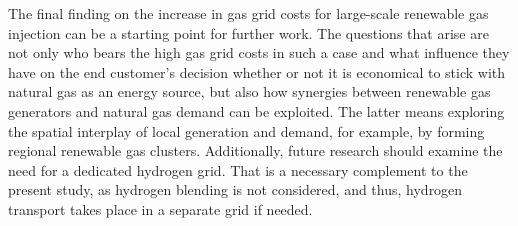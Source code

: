 The final finding on the increase in gas grid costs for large-scale renewable gas injection can be a starting point for further work. The questions that arise are not only who bears the high gas grid costs in such a case and what influence they have on the end customer's decision whether or not it is economical to stick with natural gas as an energy source, but also how synergies between renewable gas generators and natural gas demand can be exploited. The latter means exploring the spatial interplay of local generation and demand, for example, by forming regional renewable gas clusters.  Additionally, future research should examine the need for a dedicated hydrogen grid. That is a necessary complement to the present study, as hydrogen blending is not considered, and thus, hydrogen transport takes place in a separate grid if needed.\vspace{0.3cm}















